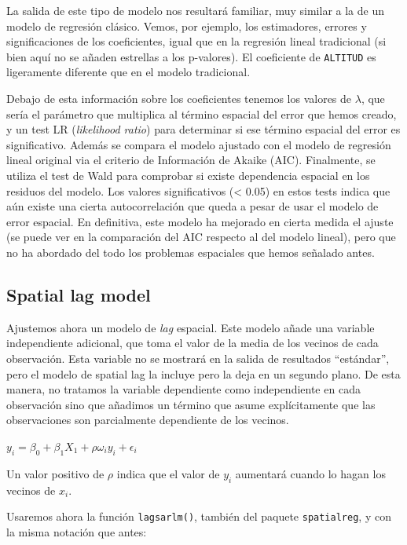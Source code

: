 \documentclass[
  letterpaper,
  DIV=11,
  numbers=noendperiod]{scrreprt}
\begin{document}
La salida de este tipo de modelo nos resultará familiar, muy similar a
la de un modelo de regresión clásico. Vemos, por ejemplo, los
estimadores, errores y significaciones de los coeficientes, igual que en
la regresión lineal tradicional (si bien aquí no se añaden estrellas a
los p-valores). El coeficiente de \texttt{ALTITUD} es ligeramente
diferente que en el modelo tradicional.

Debajo de esta información sobre los coeficientes tenemos los valores de
\(\lambda\), que sería el parámetro que multiplica al término espacial
del error que hemos creado, y un test LR (\emph{likelihood ratio}) para
determinar si ese término espacial del error es significativo. Además se
compara el modelo ajustado con el modelo de regresión lineal original
via el criterio de Información de Akaike (AIC). Finalmente, se utiliza
el test de Wald para comprobar si existe dependencia espacial en los
residuos del modelo. Los valores significativos (\textless{} 0.05) en
estos tests indica que aún existe una cierta autocorrelación que queda a
pesar de usar el modelo de error espacial. En definitiva, este modelo ha
mejorado en cierta medida el ajuste (se puede ver en la comparación del
AIC respecto al del modelo lineal), pero que no ha abordado del todo los
problemas espaciales que hemos señalado antes.

\hypertarget{spatial-lag-model}{%
\subsection{Spatial lag model}\label{spatial-lag-model}}

Ajustemos ahora un modelo de \emph{lag} espacial. Este modelo añade una
variable independiente adicional, que toma el valor de la media de los
vecinos de cada observación. Esta variable no se mostrará en la salida
de resultados ``estándar'', pero el modelo de spatial lag la incluye
pero la deja en un segundo plano. De esta manera, no tratamos la
variable dependiente como independiente en cada observación sino que
añadimos un término que asume explícitamente que las observaciones son
parcialmente dependiente de los vecinos.

\(y_i= \beta_0 + \beta_1X_1+\rho\omega_iy_i+\epsilon_i\)

Un valor positivo de \(\rho\) indica que el valor de \(y_i\) aumentará
cuando lo hagan los vecinos de \(x_i\).

Usaremos ahora la función \texttt{lagsarlm()}, también del paquete
\texttt{spatialreg}, y con la misma notación que antes:
\end{document}
